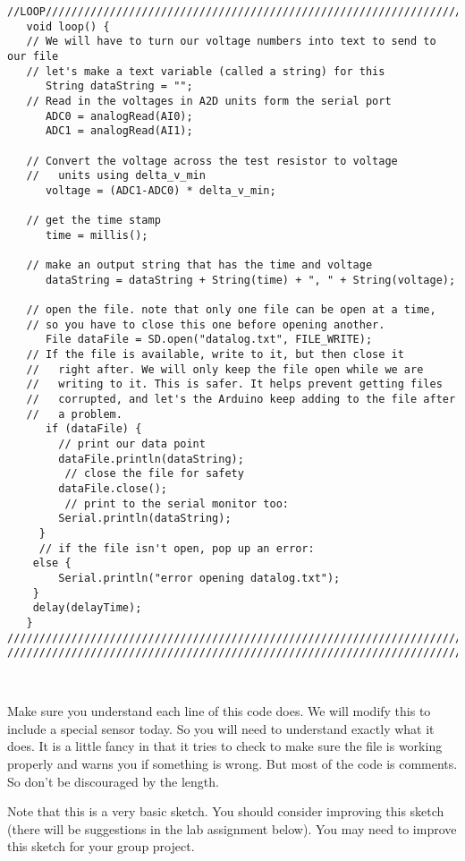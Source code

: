 \begin{verbatim}
//LOOP/////////////////////////////////////////////////////////////////////////
   void loop() {
   // We will have to turn our voltage numbers into text to send to our file
   // let's make a text variable (called a string) for this
      String dataString = ""; 
   // Read in the voltages in A2D units form the serial port
      ADC0 = analogRead(AI0); 
      ADC1 = analogRead(AI1);
 
   // Convert the voltage across the test resistor to voltage 
   //   units using delta_v_min
      voltage = (ADC1-ADC0) * delta_v_min;
 
   // get the time stamp
      time = millis();
 
   // make an output string that has the time and voltage
      dataString = dataString + String(time) + ", " + String(voltage);
     
   // open the file. note that only one file can be open at a time,
   // so you have to close this one before opening another.
      File dataFile = SD.open("datalog.txt", FILE_WRITE);
   // If the file is available, write to it, but then close it 
   //   right after. We will only keep the file open while we are 
   //   writing to it. This is safer. It helps prevent getting files 
   //   corrupted, and let's the Arduino keep adding to the file after 
   //   a problem.
      if (dataFile) {
        // print our data point
        dataFile.println(dataString);
         // close the file for safety
        dataFile.close();
         // print to the serial monitor too:
        Serial.println(dataString);
     }
     // if the file isn't open, pop up an error:
    else {
        Serial.println("error opening datalog.txt");
    }
    delay(delayTime);
   }
//////////////////////////////////////////////////////////////////////////////////////////
//////////////////////////////////////////////////////////////////////////////////////////   
 
 
\end{verbatim}

Make sure you understand each line of this code does. We will modify this to
include a special sensor today. So you will need to understand exactly what
it does. It is a little fancy in that it tries to check to make sure the
file is working properly and warns you if something is wrong. But most of
the code is comments. So don't be discouraged by the length.

Note that this is a very basic sketch. You should consider improving this
sketch (there will be suggestions in the lab assignment below). You may need
to improve this sketch for your group project.

